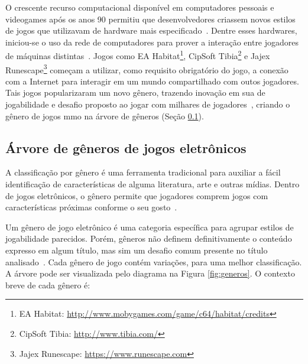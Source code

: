 O crescente recurso computacional disponível em computadores pessoais e videogames após os anos 90 permitiu que desenvolvedores criassem novos estilos de jogos que utilizavam de hardware mais especificado~\cite{adams_1208533}.
%
Dentre esses hardwares, iniciou-se o uso da rede de computadores para prover a interação entre jogadores de máquinas distintas~\cite{statisita_consumo_rede}.
%
Jogos como EA Habitat\footnote{EA Habitat: \url{http://www.mobygames.com/game/c64/habitat/credits}}, CipSoft Tibia\footnote{CipSoft Tibia: \url{http://www.tibia.com/}} e Jajex Runescape\footnote{Jajex Runescape: \url{https://www.runescape.com}} começam a utilizar, como requisito obrigatório do jogo, a conexão com a Internet para interagir em um mundo compartilhado com outos jogadores.
%
Tais jogos popularizaram um novo gênero, trazendo inovação em sua de jogabilidade e desafio proposto ao jogar com milhares de jogadores~\cite{guinness_runescape, 1417630}, criando o gênero de jogos \ac{mmo} na árvore de gêneros (Seção \ref{sec:arvore_generos}).



\subsection{Árvore de gêneros de jogos eletrônicos}
\label{sec:arvore_generos}


A classificação por gênero é uma ferramenta tradicional para auxiliar a fácil identificação de características de alguma literatura, arte e outras mídias.
%
Dentro de jogos eletrônicos, o gênero permite que jogadores comprem jogos com características próximas conforme o seu gosto~\cite{Clarke2015}.



Um gênero de jogo eletrônico é uma categoria específica para agrupar estilos de jogabilidade parecidos.
%
Porém, gêneros não definem definitivamente o conteúdo expresso em algum título, mas sim um desafio comum presente no título analisado~\cite{adams_1208533, video_game_technologies}.
%
Cada gênero de jogo contém variações, para uma melhor classificação.
%
A árvore pode ser visualizada pelo diagrama na Figura \ref{fig:generos}.
%
O contexto breve de cada gênero é:




